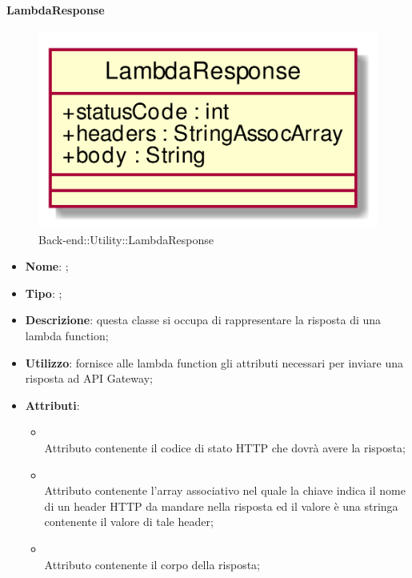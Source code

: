 \hypertarget{LambdaResponse_label}{\paragraph{LambdaResponse}}
\begin{figure}[h]
	\centering
	\includegraphics[width=\textwidth,height=\textheight,keepaspectratio]{images/ClassLambdaResponse.png}
	\caption{Back-end::Utility::LambdaResponse}
\end{figure}
\begin{itemize}
	\item \textbf{Nome}: ;
	\item \textbf{Tipo}: ;
	\item \textbf{Descrizione}: questa classe si occupa di rappresentare la risposta di una lambda function;
	\item \textbf{Utilizzo}: fornisce alle lambda function gli attributi necessari per inviare una risposta ad API Gateway;
	\item \textbf{Attributi}:
	\begin{itemize}
		\item[]  \\
		Attributo contenente il codice di stato HTTP che dovrà avere la risposta;
		\item[]  \\
		Attributo contenente l'array associativo nel quale la chiave indica il nome di un header HTTP da mandare nella risposta ed il valore è una stringa contenente il valore di tale header;
		\item[]  \\
		Attributo contenente il corpo della risposta;
	\end{itemize}
\end{itemize}
\FloatBarrier


